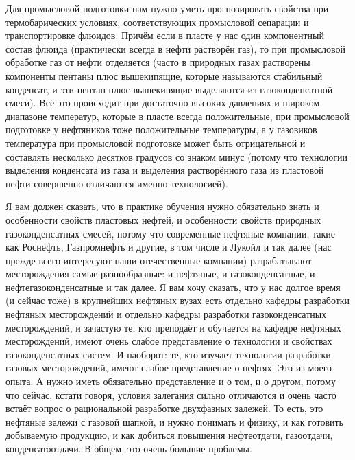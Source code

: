 \documentclass[main.tex]{subfiles}
\begin{document}
Для промысловой подготовки нам нужно уметь прогнозировать свойства при термобарических условиях, соответствующих промысловой сепарации и транспортировке флюидов.
Причём если в пласте у нас один компонентный состав флюида (практически всегда в нефти растворён газ), то при промысловой обработке газ от нефти отделяется (часто в природных газах растворены компоненты пентаны плюс вышекипящие, которые называются стабильный конденсат, и эти пентан плюс вышекипящие выделяются из газоконденсатной смеси).
Всё это происходит при достаточно высоких давлениях и широком диапазоне температур, которые в пласте всегда положительные, при промысловой подготовке у нефтяников тоже положительные температуры, а у газовиков температура при промысловой подготовке может быть отрицательной и составлять несколько десятков градусов со знаком минус (потому что технологии выделения конденсата из газа и выделения растворённого газа из пластовой нефти совершенно отличаются именно технологией).

Я вам должен сказать, что в практике обучения нужно обязательно знать и особенности свойств пластовых нефтей, и особенности свойств природных газоконденсатных смесей, потому что современные нефтяные компании, такие как Роснефть, Газпромнефть и другие, в том числе и Лукойл и так далее (нас прежде всего интересуют наши отечественные компании) разрабатывают месторождения самые разнообразные: и нефтяные, и газоконденсатные, и нефтегазоконденсатные и так далее.
Я вам хочу сказать, что у нас долгое время (и сейчас тоже) в крупнейших нефтяных вузах есть отдельно кафедры разработки нефтяных месторождений и отдельно кафедры разработки газоконденсатных месторождений, и зачастую те, кто преподаёт и обучается на кафедре нефтяных месторождений, имеют очень слабое представление о технологии и свойствах газоконденсатных систем.
И наоборот: те, кто изучает технологии разработки газовых месторождений, имеют слабое представление о нефтях.
Это из моего опыта.
А нужно иметь обязательно представление и о том, и о другом, потому что сейчас, кстати говоря, условия залегания сильно отличаются и очень часто встаёт вопрос о рациональной разработке двухфазных залежей.
То есть, это нефтяные залежи с газовой шапкой, и нужно понимать и физику, и как готовить добываемую продукцию, и как добиться повышения нефтеотдачи, газоотдачи, конденсатоотдачи.
В общем, это очень большие проблемы.
\end{document}
